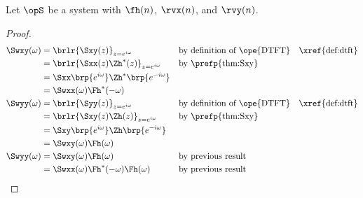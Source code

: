\begin{corollary}
\label{cor:Swxy}
Let $\opS$ be a system with  $\fh(n)$,
 $\rvx(n)$, and  $\rvy(n)$.
\end{corollary}
\begin{proof}
\begin{align*}
   \Swxy(\omega)
     &= \brlr{\Sxy(z)}_{z=e^{i\omega}}
     && \text{by definition of \ope{DTFT}}
     && \text{\xref{def:dtft}}
   \\&= \brlr{\Sxx(z)\Zh^\ast(z)}_{z=e^{i\omega}}
     && \text{by \prefp{thm:Sxy}}
   \\&= \Sxx\brp{e^{i\omega}}\Zh^\ast\brp{e^{-i\omega}}
   \\&= \Swxx(\omega) \Fh^\ast(-\omega)
   \\
   \Swyy(\omega)
     &= \brlr{\Syy(z)}_{z=e^{i\omega}}
     && \text{by definition of \ope{DTFT}}
     && \text{\xref{def:dtft}}
   \\&= \brlr{\Sxy(z)\Zh(z)}_{z=e^{i\omega}}
     && \text{by \prefp{thm:Sxy}}
   \\&= \Sxy\brp{e^{i\omega}}\Zh\brp{e^{-i\omega}}
   \\&= \Swxy(\omega) \Fh(\omega)
   \\
   \Swyy(\omega)
     &= \Swxy(\omega) \Fh(\omega)
     && \text{by previous result}
   \\&= \Swxx(\omega) \Fh^\ast(-\omega) \Fh(\omega)
     && \text{by previous result}
\end{align*}
\end{proof}

